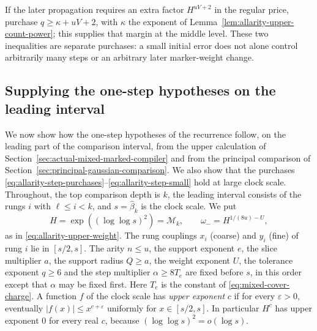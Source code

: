 If the later propagation requires an extra factor $H^{uV+2}$ in the
regular price, purchase $q\ge\kappa+uV+2$, with $\kappa$ the exponent of
Lemma~\ref{lem:allarity-upper-count-power}; this supplies that margin at
the middle level. These two inequalities are separate purchases: a
small initial error does not alone control arbitrarily many steps or an
arbitrary later marker-weight change.

\subsection{Supplying the one-step hypotheses on the leading interval}
\label{subsec:allarity-step-supply}

We now show how the one-step hypotheses of the recurrence follow, on the
leading part of the comparison interval, from the upper calculation of
Section~\ref{sec:actual-mixed-marked-compiler} and from the principal
comparison of Section~\ref{sec:principal-gaussian-comparison}. We also
show that the purchases
\eqref{eq:allarity-step-purchases}--\eqref{eq:allarity-step-small} hold
at large clock scale. Throughout, the top comparison depth is $k$, the
leading interval consists of the rungs $i$ with $\ell\le i<k$, and
$s=\widehat\beta_k$ is the clock scale. We put
\[
 H=\exp((\log\log s)^2)=\mathcal M_k,\qquad
 \omega_-=H^{1/(8u)-U},
\]
as in \eqref{eq:allarity-upper-weight}. The rung couplings $x_i$ (coarse)
and $y_i$ (fine) of rung $i$ lie in $[s/2,s]$. The arity $n\le u$, the
support exponent $e$, the slice multiplier $a$, the support radius
$Q\ge a$, the weight exponent $U$, the tolerance exponent $q\ge6$ and the
step multiplier $\alpha\ge8T_e$ are fixed before $s$, in this order
except that $\alpha$ may be fixed first. Here $T_e$ is the constant of
\eqref{eq:mixed-cover-charge}. A function $f$ of the clock scale has
\emph{upper exponent} $c$ if for every $\varepsilon>0$, eventually
$|f(x)|\le x^{c+\varepsilon}$ uniformly for $x\in[s/2,s]$. In particular
$H^{c}$ has upper exponent $0$ for every real $c$, because
$(\log\log s)^2=o(\log s)$.

